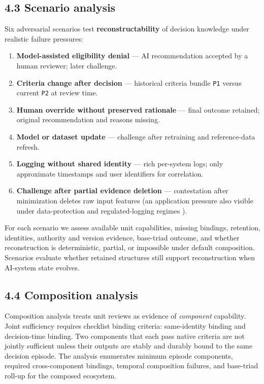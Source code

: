 \documentclass[11pt,a4paper]{article}
\begin{document}
\subsection{4.3 Scenario analysis}

Six adversarial scenarios test \textbf{reconstructability} of decision knowledge under realistic failure pressures:


\begin{enumerate}
\item \textbf{Model-assisted eligibility denial} --- AI recommendation accepted by a human reviewer; later challenge.
\item \textbf{Criteria change after decision} --- historical criteria bundle \texttt{P1} versus current \texttt{P2} at review time.
\item \textbf{Human override without preserved rationale} --- final outcome retained; original recommendation and reasons missing.
\item \textbf{Model or dataset update} --- challenge after retraining and reference-data refresh.
\item \textbf{Logging without shared identity} --- rich per-system logs; only approximate timestamps and user identifiers for correlation.
\item \textbf{Challenge after partial evidence deletion} --- contestation after minimization deletes raw input features (an application pressure also visible under data-protection and regulated-logging regimes \citep{eu2024aiAct}).
\end{enumerate}

For each scenario we assess available unit capabilities, missing bindings, retention, identities, authority and version evidence, base-triad outcome, and whether reconstruction is deterministic, partial, or impossible under default composition. Scenarios evaluate whether retained structures still support reconstruction when AI-system state evolves.


\subsection{4.4 Composition analysis}

Composition analysis treats unit reviews as evidence of \emph{component} capability. Joint sufficiency requires checklist binding criteria: same-identity binding and decision-time binding. Two components that each pass native criteria are not jointly sufficient unless their outputs are stably and durably bound to the same decision episode. The analysis enumerates minimum episode components, required cross-component bindings, temporal composition failures, and base-triad roll-up for the composed ecosystem.
\end{document}
